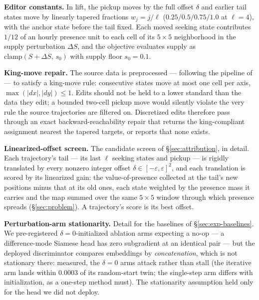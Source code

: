 \textbf{Editor constants.} In lift, the pickup moves by the full offset
$\delta$ and earlier tail states move by linearly tapered fractions
$w_j = j/\ell$ ($0.25/0.5/0.75/1.0$ at $\ell = 4$), with the anchor state
before the tail fixed. Each moved seeking state contributes $1/12$ of an hourly
presence unit to each cell of its $5{\times}5$ neighborhood in the supply
perturbation $\Delta S$, and the objective evaluates supply as
$\mathrm{clamp}(S + \Delta S,\, s_0)$ with supply floor $s_0 = 0.1$.

\textbf{King-move repair.} The source data is preprocessed --- following the
pipeline of \cite{zhang2022cgail} --- to satisfy a king-move rule: consecutive
states move at most one cell per axis, $\max(|dx|,|dy|) \le 1$. Edits should
not be held to a lower standard than the data they edit; a bounded two-cell
pickup move would silently violate the very rule the source trajectories are
filtered on. Discretized edits therefore pass through an exact
backward-reachability repair that returns the king-compliant assignment
nearest the tapered targets, or reports that none exists.

\textbf{Linearized-offset screen.} The candidate screen of
\S\ref{sec:attribution}, in detail. Each trajectory's tail --- its last
$\ell$ seeking states and pickup --- is rigidly translated by every nonzero
integer offset $\delta \in [-\varepsilon, \varepsilon]^{2}$, and each
translation is scored by its linearized gain: the value-of-presence
collected at the tail's new positions minus that at its old ones, each state
weighted by the presence mass it carries and the map summed over the same
$5{\times}5$ window through which presence spreads (\S\ref{sec:problem}). A
trajectory's score is its best offset.

\textbf{Perturbation-arm stationarity.} Detail for the
baselines of \S\ref{sec:exp-baselines}. We pre-registered
$\delta = 0$-initialized ablation arms expecting a no-op --- a
difference-mode Siamese head has zero subgradient at an identical pair ---
but the deployed discriminator compares embeddings by \emph{concatenation},
which is not stationary there: measured, the $\delta = 0$ arms attack rather
than stall (the iterative arm lands within $0.0003$ of its random-start
twin; the single-step arm differs with initialization, as a one-step method
must). The stationarity assumption held only for the head we did not deploy.

